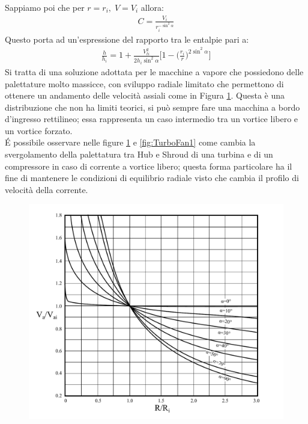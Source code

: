 Sappiamo poi che per $r=r_i,\; V=V_i$ allora:
\begin{align*}
C = \frac{V_i}{r_i^{-\sin^2 \alpha}}
\end{align*}
Questo porta ad un'espressione del rapporto tra le entalpie pari a:
\begin{align*}
\boxed{ \frac{h}{h_i} =  1+ \frac{V_{ti}^2}{2 h_i \sin^2 \alpha} \bigg[1- \bigg(\frac{r_i}{r} \bigg) ^{2 \sin^2 \alpha} \bigg]}
\end{align*}
Si tratta di una soluzione adottata per le macchine a vapore che possiedono delle palettature molto massicce, con sviluppo radiale limitato che permettono di ottenere un andamento delle velocità assiali come in Figura \ref{fig:AngPalCost}. Questa è una distribuzione che non ha limiti teorici, si può sempre fare una macchina a bordo d'ingresso rettilineo; essa rappresenta un caso intermedio tra un vortice libero e un vortice forzato.\\
\'E possibile osservare nelle figure \ref{fig:AngPalCost} e \ref{fig:TurboFan1} come cambia la svergolamento della palettatura tra Hub e Shroud di una turbina e di un compressore in caso di corrente a vortice libero; questa forma particolare ha il fine di mantenere le condizioni di equilibrio radiale visto che cambia il profilo di velocità della corrente.
\begin{figure}
\centering
  \includegraphics[width=.8\textwidth]{fig/AngPalCost.pdf}
\caption{}
\label{fig:AngPalCost}
\end{figure}

